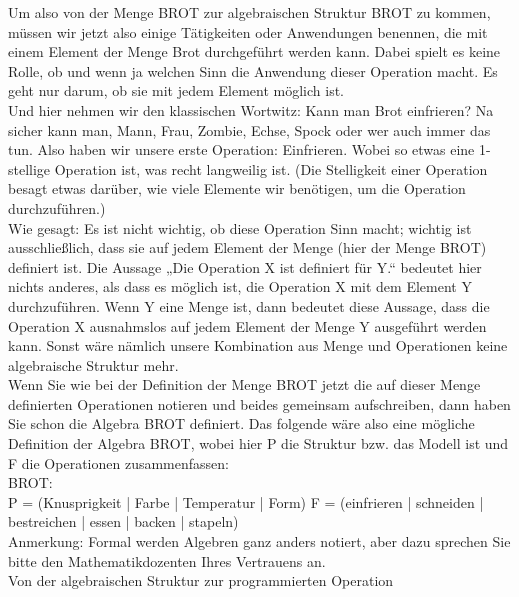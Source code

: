Um also von der Menge BROT zur algebraischen Struktur BROT zu kommen, müssen wir jetzt also einige Tätigkeiten oder Anwendungen benennen, die mit einem Element der Menge Brot durchgeführt werden kann. Dabei spielt es keine Rolle, ob und wenn ja welchen Sinn die Anwendung dieser Operation macht. Es geht nur darum, ob sie mit jedem Element möglich ist.\\

Und hier nehmen wir den klassischen Wortwitz: Kann man Brot einfrieren? Na sicher kann man, Mann, Frau, Zombie, Echse, Spock oder wer auch immer das tun. Also haben wir unsere erste Operation: Einfrieren. Wobei so etwas eine 1-stellige Operation ist, was recht langweilig ist. (Die Stelligkeit einer Operation besagt etwas darüber, wie viele Elemente wir benötigen, um die Operation durchzuführen.)\\

Wie gesagt: Es ist nicht wichtig, ob diese Operation Sinn macht; wichtig ist ausschließlich, dass sie auf jedem Element der Menge (hier der Menge BROT) definiert ist. Die Aussage „Die Operation X ist definiert für Y.“ bedeutet hier nichts anderes, als dass es möglich ist, die Operation X mit dem Element Y durchzuführen. Wenn Y eine Menge ist, dann bedeutet diese Aussage, dass die Operation X ausnahmslos auf jedem Element der Menge Y ausgeführt werden kann. Sonst wäre nämlich unsere Kombination aus Menge und Operationen keine algebraische Struktur mehr.\\

Wenn Sie wie bei der Definition der Menge BROT jetzt die auf dieser Menge definierten Operationen notieren und beides gemeinsam aufschreiben, dann haben Sie schon die Algebra BROT definiert. Das folgende wäre also eine mögliche Definition der Algebra BROT, wobei hier P die Struktur bzw. das Modell ist und F die Operationen zusammenfassen:\\

BROT: \\

P = (Knusprigkeit | Farbe | Temperatur | Form)
F = (einfrieren | schneiden | bestreichen | essen | backen | stapeln)\\

Anmerkung: Formal werden Algebren ganz anders notiert, aber dazu sprechen Sie bitte den Mathematikdozenten Ihres Vertrauens an.\\

Von der algebraischen Struktur zur programmierten Operation\\

